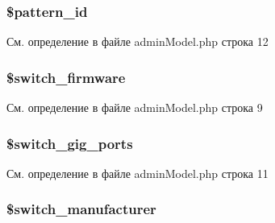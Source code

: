 \hypertarget{classadmin_model_af374d5f9d4e5b9dca9e10c4053ddbd3b}{
\subsubsection[{\$pattern\-\_\-id}]{\setlength{\rightskip}{0pt plus 5cm}\$pattern\-\_\-id}}\label{classadmin_model_af374d5f9d4e5b9dca9e10c4053ddbd3b}


См. определение в файле admin\-Model.\-php строка 12

\hypertarget{classadmin_model_aaba9e06ee8c7745e9ffc30dbdb001f0a}{
\subsubsection[{\$switch\-\_\-firmware}]{\setlength{\rightskip}{0pt plus 5cm}\$switch\-\_\-firmware}}\label{classadmin_model_aaba9e06ee8c7745e9ffc30dbdb001f0a}


См. определение в файле admin\-Model.\-php строка 9

\hypertarget{classadmin_model_aa33faaec4d5d8fe44e40333da0d4734f}{
\subsubsection[{\$switch\-\_\-gig\-\_\-ports}]{\setlength{\rightskip}{0pt plus 5cm}\$switch\-\_\-gig\-\_\-ports}}\label{classadmin_model_aa33faaec4d5d8fe44e40333da0d4734f}


См. определение в файле admin\-Model.\-php строка 11

\hypertarget{classadmin_model_a2b1ea6f804c1caa0c3e824412fe37b16}{
\subsubsection[{\$switch\-\_\-manufacturer}]{\setlength{\rightskip}{0pt plus 5cm}\$switch\-\_\-manufacturer}}\label{classadmin_model_a2b1ea6f804c1caa0c3e824412fe37b16}


